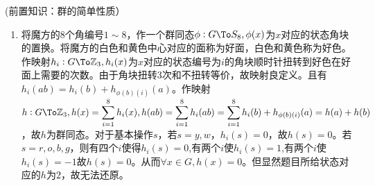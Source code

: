 \documentclass[UTF8, a4paper, 12pt, oneside, twocolumn]{article}
\numberwithin{equation}{section}
\numberwithin{figure}{section}
\numberwithin{table}{section}
\def\dsum{\displaystyle\sum}	%
\def\Z{\mathbb{Z}}	%
\newif\ifproof
\newenvironment{Ex}[1][]{\prooffalse \begin{EExercise}{#1}{}}%
{\ifproof%
\hfill\ensuremath{\square}\end{Proof}%
\fi%
\end{EExercise}}
\begin{document}
\begin{Ex}[(前置知识：群的简单性质）]
\begin{enumerate}
\item 将魔方的8个角编号$1\sim 8$，作一个群同态$\phi:G\To S_{8},\phi(x)$为$x$对应的状态角块的置换。将魔方的白色和黄色中心对应的面称为好面，白色和黄色称为好色。作映射$h_i:G\To \Z_3,h_i(x)$为$x$对应的状态编号为$i$的角块顺时针扭转到好色在好面上需要的次数。由于角块扭转3次和不扭转等价，故映射良定义。且有$h_i(ab)=h_i(b)+h_{\phi(b)(i)}(a)$。作映射$h:G\To\Z_3,h(x)=\dsum_{i=1}^8h_i(x),h(ab)=\dsum_{i=1}^8h_i(ab)=\dsum_{i=1}^8h_i(b)+h_{\phi(b)(i)}(a)=h(a)+h(b)$，故$h$为群同态。对于基本操作$s$，若$s=y,w$，$h_i(s)=0$，故$h(s)=0$。若$s=r,o,b,g$，则有四个$i$使得$h_i(s)=0$,有两个$i$使$h_i(s)=1$,有两个$i$使$h_i(s)=-1$故$h(s)=0$。从而$\forall x\in G,h(x)=0$。但显然题目所给状态对应的$h$为$2$，故无法还原。
\end{enumerate}
\end{Ex}
\end{document}
